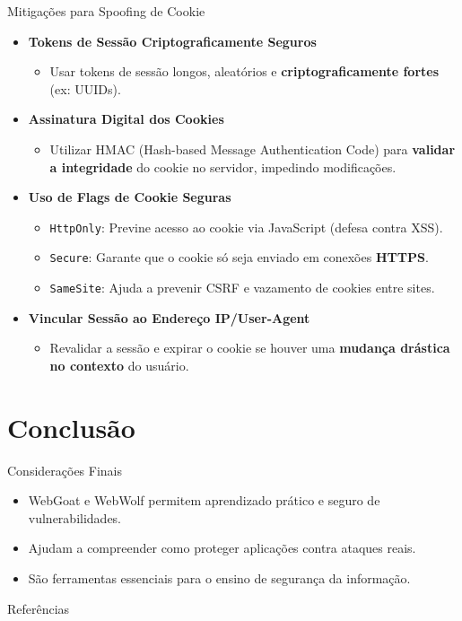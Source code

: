 \documentclass[aspectratio=169]{beamer}
\begin{document}
\begin{frame}{Mitigações para Spoofing de Cookie}
    \begin{itemize}
        \item \textbf{Tokens de Sessão Criptograficamente Seguros}
        \begin{itemize}
            \item Usar tokens de sessão longos, aleatórios e \textbf{criptograficamente fortes} (ex: UUIDs).
        \end{itemize}

        \item \textbf{Assinatura Digital dos Cookies}
        \begin{itemize}
            \item Utilizar HMAC (Hash-based Message Authentication Code) para \textbf{validar a integridade} do cookie no servidor, impedindo modificações.
        \end{itemize}

        \item \textbf{Uso de Flags de Cookie Seguras}
        \begin{itemize}
            \item \texttt{HttpOnly}: Previne acesso ao cookie via JavaScript (defesa contra XSS).
            \item \texttt{Secure}: Garante que o cookie só seja enviado em conexões \textbf{HTTPS}.
            \item \texttt{SameSite}: Ajuda a prevenir CSRF e vazamento de cookies entre sites.
        \end{itemize}

        \item \textbf{Vincular Sessão ao Endereço IP/User-Agent}
        \begin{itemize}
            \item Revalidar a sessão e expirar o cookie se houver uma \textbf{mudança drástica no contexto} do usuário.
        \end{itemize}
    \end{itemize}
\end{frame}

\section{Conclusão}

\begin{frame}{Considerações Finais}
    \begin{itemize}
        \item WebGoat e WebWolf permitem aprendizado prático e seguro de vulnerabilidades.
        \item Ajudam a compreender como proteger aplicações contra ataques reais.
        \item São ferramentas essenciais para o ensino de segurança da informação.
    \end{itemize}
\end{frame}

\begin{frame}[allowframebreaks]{Referências}
    \nocite{*}
    \printbibliography
\end{frame}
\end{document}
